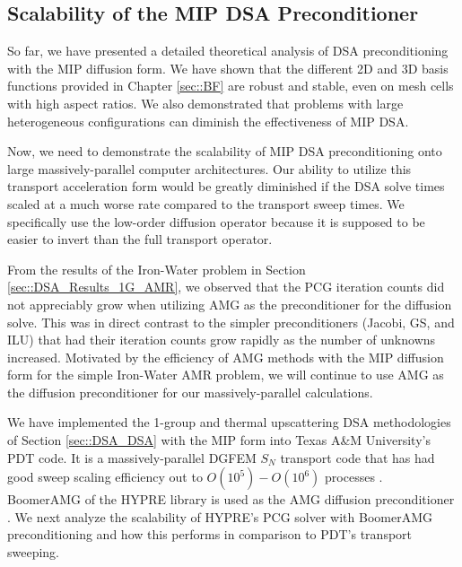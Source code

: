 \subsection{Scalability of the MIP DSA Preconditioner}
\label{sec::DSA_Results_Scaling}

So far, we have presented a detailed theoretical analysis of DSA preconditioning with the MIP diffusion form. We have shown that the different 2D and 3D basis functions provided in Chapter \ref{sec::BF} are robust and stable, even on mesh cells with high aspect ratios. We also demonstrated that problems with large heterogeneous configurations can diminish the effectiveness of MIP DSA.

Now, we need to demonstrate the scalability of MIP DSA preconditioning onto large massively-parallel computer architectures. Our ability to utilize this transport acceleration form would be greatly diminished if the DSA solve times scaled at a much worse rate compared to the transport sweep times. We specifically use the low-order diffusion operator because it is supposed to be easier to invert than the full transport operator.

From the results of the Iron-Water problem in Section \ref{sec::DSA_Results_1G_AMR}, we observed that the PCG iteration counts did not appreciably grow when utilizing AMG as the preconditioner for the diffusion solve. This was in direct contrast to the simpler preconditioners (Jacobi, GS, and ILU) that had their iteration counts grow rapidly as the number of unknowns increased. Motivated by the efficiency of AMG methods with the MIP diffusion form for the simple Iron-Water AMR problem, we will continue to use AMG as the diffusion preconditioner for our massively-parallel calculations.

We have implemented the 1-group and thermal upscattering DSA methodologies of Section \ref{sec::DSA_DSA} with the MIP form into Texas A\&M University's PDT code. It is a massively-parallel DGFEM $S_N$ transport code that has had good sweep scaling efficiency out to $O(10^5)-O(10^6)$ processes \cite{ref::eff_sweeps,adams2013provably}. BoomerAMG of the HYPRE library is used as the AMG diffusion preconditioner \cite{ref::hypre,yang2002boomeramg}. We next analyze the scalability of HYPRE's PCG solver with BoomerAMG preconditioning and how this performs in comparison to PDT's transport sweeping.

